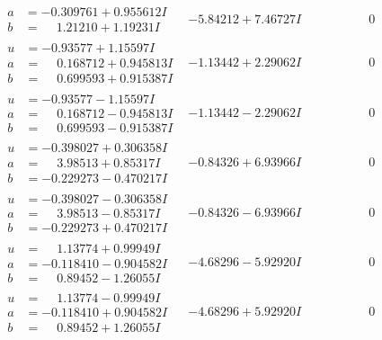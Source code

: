 \documentclass[1p]{elsarticle_modified}
\theoremstyle{definition}
\begin{document}
$$\begin{array}{c|c|c}
\begin{aligned}
a &= -0.309761 + 0.955612 I \\
b &= \phantom{-}1.21210 + 1.19231 I\end{aligned}
 & -5.84212 + 7.46727 I & \phantom{-0.000000 } 0 \\ \hline\begin{aligned}
u &= -0.93577 + 1.15597 I \\
a &= \phantom{-}0.168712 + 0.945813 I \\
b &= \phantom{-}0.699593 + 0.915387 I\end{aligned}
 & -1.13442 + 2.29062 I & \phantom{-0.000000 } 0 \\ \hline\begin{aligned}
u &= -0.93577 - 1.15597 I \\
a &= \phantom{-}0.168712 - 0.945813 I \\
b &= \phantom{-}0.699593 - 0.915387 I\end{aligned}
 & -1.13442 - 2.29062 I & \phantom{-0.000000 } 0 \\ \hline\begin{aligned}
u &= -0.398027 + 0.306358 I \\
a &= \phantom{-}3.98513 + 0.85317 I \\
b &= -0.229273 - 0.470217 I\end{aligned}
 & -0.84326 + 6.93966 I & \phantom{-0.000000 } 0 \\ \hline\begin{aligned}
u &= -0.398027 - 0.306358 I \\
a &= \phantom{-}3.98513 - 0.85317 I \\
b &= -0.229273 + 0.470217 I\end{aligned}
 & -0.84326 - 6.93966 I & \phantom{-0.000000 } 0 \\ \hline\begin{aligned}
u &= \phantom{-}1.13774 + 0.99949 I \\
a &= -0.118410 - 0.904582 I \\
b &= \phantom{-}0.89452 - 1.26055 I\end{aligned}
 & -4.68296 - 5.92920 I & \phantom{-0.000000 } 0 \\ \hline\begin{aligned}
u &= \phantom{-}1.13774 - 0.99949 I \\
a &= -0.118410 + 0.904582 I \\
b &= \phantom{-}0.89452 + 1.26055 I\end{aligned}
 & -4.68296 + 5.92920 I & \phantom{-0.000000 } 0 \\ \hline\begin{aligned}

\end{aligned}
\end{array}$$
\end{document}

